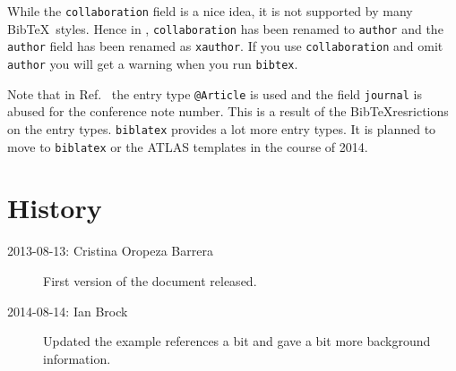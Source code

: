 \documentclass[UKenglish]{latex/atlasdoc}
\newcommand*{\BibTeX}{Bib\TeX}
\begin{document}
While the \texttt{collaboration} field is a nice idea, it is not supported by many \BibTeX\ styles.
Hence in \cite{lhcCollaboration:2012}, \texttt{collaboration} has been renamed to \texttt{author} and
the \texttt{author} field has been renamed as \texttt{xauthor}. If you use \texttt{collaboration} and omit
\texttt{author} you will get a warning when you run \texttt{bibtex}.

Note that in Ref.~\cite{atlasConf:2012} the entry type \texttt{@Article} is used and the field \texttt{journal} 
is abused for the conference note number. This is a result of the \BibTeX resrictions on the entry types.
\texttt{biblatex} provides a lot more entry types. It is planned to move to \texttt{biblatex} or the ATLAS templates
in the course of 2014.


\section*{History}

\begin{description}
  \item[2013-08-13: Cristina Oropeza Barrera] First version of the document released.
  \item[2014-08-14: Ian Brock] Updated the example references a bit and gave a bit more background information.
\end{description}

\printbibliography
% 
% 
\end{document}

